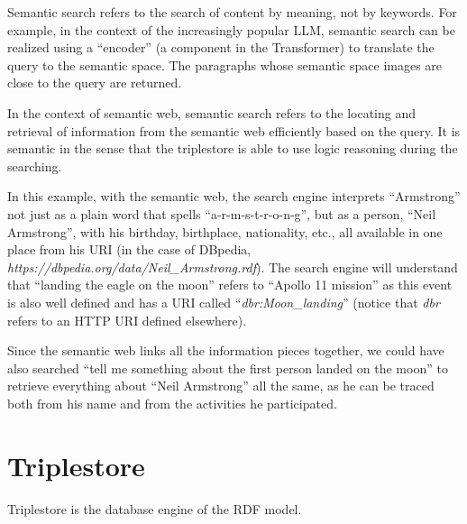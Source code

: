 Semantic search refers to the search of content by meaning, not by keywords. For example, in the context of the increasingly popular LLM, semantic search can be realized using a ``encoder'' (a component in the Transformer) to translate the query to the semantic space. The paragraphs whose semantic space images are close to the query are returned.

In the context of semantic web, semantic search refers to the locating and retrieval of information from the semantic web efficiently based on the query. It is semantic in the sense that the triplestore is able to use logic reasoning during the searching.

In this example, with the semantic web, the search engine interprets ``Armstrong'' not just as a plain word that spells ``a-r-m-s-t-r-o-n-g'', but as a person, ``Neil Armstrong'', with his birthday, birthplace, nationality, etc., all available in one place from his URI (in the case of DBpedia, \textit{https://dbpedia.org/data/Neil\_Armstrong.rdf}). The search engine will understand that ``landing the eagle on the moon'' refers to ``Apollo 11 mission'' as this event is also well defined and has a URI called ``\textit{dbr:Moon\_landing}'' (notice that \textit{dbr} refers to an HTTP URI defined elsewhere). 

Since the semantic web links all the information pieces together, we could have also searched ``tell me something about the first person landed on the moon'' to retrieve everything about ``Neil Armstrong'' all the same, as he can be traced both from his name and from the activities he participated.

\section{Triplestore}

Triplestore is the database engine of the RDF model. 

